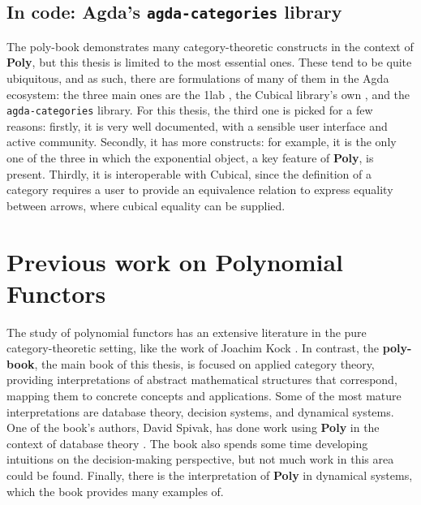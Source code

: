 \subsection{In code: Agda's \texttt{agda-categories} library}

The poly-book demonstrates many category-theoretic constructs in the context of \textbf{Poly}, but this thesis is limited to the most essential ones. These tend to be quite ubiquitous, and as such, there are formulations of many of them in the Agda ecosystem: the three main ones are the 1lab \cite{1lab}, the Cubical library's own \cite{cubical-cat}, and the \texttt{agda-categories} \cite{agda-cats} library. For this thesis, the third one is picked for a few reasons: firstly, it is very well documented, with a sensible user interface and active community. Secondly, it has more constructs: for example, it is the only one of the three in which the exponential object, a key feature of \textbf{Poly}, is present. Thirdly, it is interoperable with Cubical, since the definition of a category requires a user to provide an equivalence relation to express equality between arrows, where cubical equality can be supplied.

\section{Previous work on Polynomial Functors}

The study of polynomial functors has an extensive literature in the pure category-theoretic setting, like the work of Joachim Kock \cite{kockpoly} \cite{kock2009polynomial}. In contrast, the \textbf{poly-book}, the main book of this thesis, is focused on applied category theory, providing interpretations of abstract mathematical structures that correspond, mapping them to concrete concepts and applications. Some of the most mature interpretations are database theory, decision systems, and dynamical systems. One of the book's authors, David Spivak, has done work using \textbf{Poly} in the context of database theory \cite{spivak2023functorial}. The book also spends some time developing intuitions on the decision-making perspective, but not much work in this area could be found. Finally, there is the interpretation of \textbf{Poly} in dynamical systems, which the book provides many examples of.

